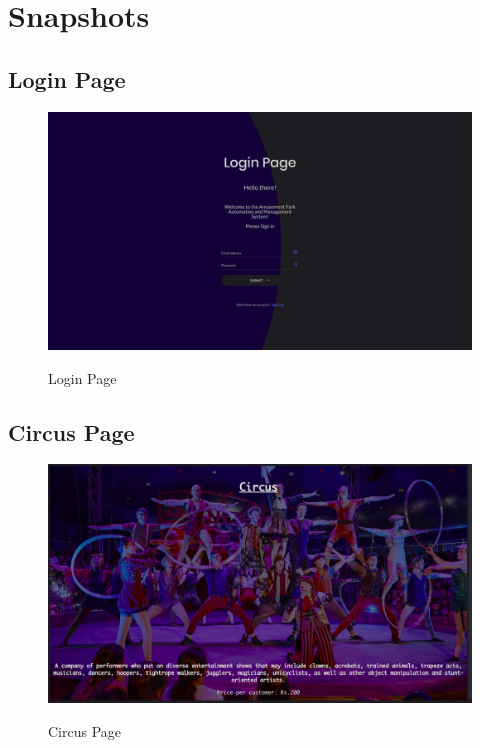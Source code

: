 \titlespacing{\chapter}{0pt}{-30pt}{5pt}

\chapter{Snapshots}

\section{Login Page}
\begin{figure}[H]
\caption{Login Page}
\includegraphics[scale=.22]{./lgn.png}
\\[0.2in]
\label{fig:Login Page}
\end{figure}

\thispagestyle{fancy}


\section{Circus Page}
\begin{figure}[H]
\caption{Circus Page}
\includegraphics[scale=.20]{./crc.png}
\\[0.2in]
\label{fig:Circus Page}
\end{figure}

